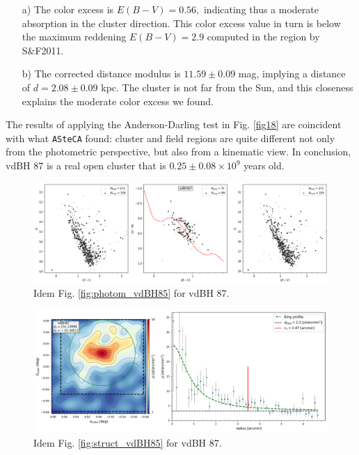 \documentclass[draft]{aa}
\begin{document}
\begin{itemize}
\item [a)] The color excess is $E(B-V)=0.56,$ indicating thus a moderate
    absorption in the cluster direction. This color excess value in turn is
    below the maximum reddening $E(B-V)=2.9$ computed in the region by 
    S\&F2011.
\item [b)] The corrected distance modulus is $11.59\pm0.09$ mag, implying a
distance of $d=2.08\pm0.09$ kpc. The cluster is not far from the Sun, and
this closeness explains the moderate color excess we found.
\end{itemize}

The results of applying the Anderson-Darling test in Fig. \ref{fig18}
are coincident with what \texttt{ASteCA}  found: cluster and
field regions are quite different not only from the photometric perspective, but
also from a kinematic view.
In conclusion, vdBH 87 is a real open cluster that is $0.25\pm0.08\times10^9$
years old.

\begin{figure}[ht]
    \centering
    \includegraphics[width=\hsize]{../figs/obs_vdBH87.png}
    \caption{Idem Fig. \ref{fig:photom_vdBH85} for vdBH 87.}
    \label{fig15}
\end{figure}

\begin{figure}[ht]
    \centering
    \includegraphics[width=\hsize]{../figs/dmap_vdbh87.png}
    \caption{Idem Fig. \ref{fig:struct_vdBH85} for vdBH 87.}
    \label{fig16}
\end{figure}
\end{document}
